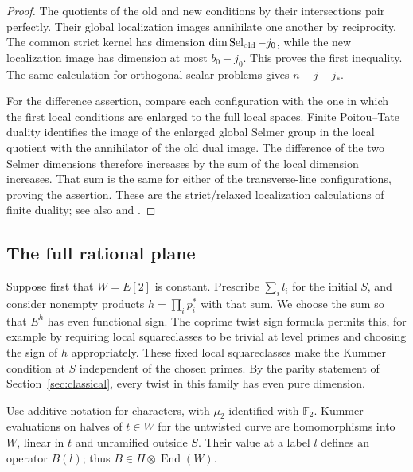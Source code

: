 \begin{proof}
The quotients of the old and new conditions by their intersections pair
perfectly.  Their global localization images annihilate one another by
reciprocity.  The common strict kernel has dimension
\(\dim\operatorname{Sel}_{\rm old}-j_0\), while the new localization image
has dimension at most \(b_0-j_0\).  This proves the first inequality.
The same calculation for orthogonal scalar problems gives
\(n-j-j_*\).

For the difference assertion, compare each configuration with the one in
which the first local conditions are enlarged to the full local spaces.
Finite Poitou--Tate duality identifies the image of the enlarged global
Selmer group in the local quotient with the annihilator of the old dual
image.  The difference of the two Selmer dimensions therefore increases
by the sum of the local dimension increases.  That sum is the same for
either of the transverse-line configurations, proving the assertion.
These are the strict/relaxed localization calculations of finite duality;
see also \cite[Lemma~3.2 and Proposition~3.3]{MazurRubin10} and
\cite{MilneADT}.
\end{proof}

\subsection{The full rational plane}

Suppose first that \(W=E[2]\) is constant.  Prescribe \(\sum_i l_i\) for the
initial \(S\), and consider nonempty products \(h=\prod_i p_i^*\) with
that sum.  We choose the sum so that \(E^h\) has even functional sign.
The coprime twist sign formula permits this, for example by requiring
local squareclasses to be trivial at level primes and choosing the sign
of \(h\) appropriately.  These fixed local squareclasses make the Kummer
condition at \(S\) independent of the chosen primes.  By the parity
statement of Section~\ref{sec:classical}, every twist in this family has
even pure dimension.

Use additive notation for characters, with \(\mu_2\) identified with
\(\mathbb F_2\).  Kummer evaluations on halves of \(t\in W\) for the
untwisted curve are homomorphisms into \(W\), linear in \(t\) and
unramified outside \(S\).  Their value at a label \(l\) defines an operator
\(B(l)\); thus \(B\in H\otimes\operatorname{End}(W)\).

